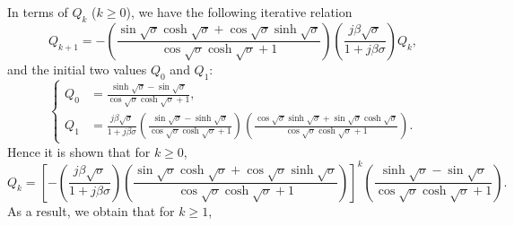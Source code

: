 \documentclass{svjour3}                     %
\begin{document}
In terms of $Q_k$ ($k \geq 0$), we have the following iterative relation
\begin{equation}
    Q_{k+1} = - \left( \frac{ \sin\sqrt{\sigma} \cosh\sqrt{\sigma} + \cos\sqrt{\sigma} \sinh\sqrt{\sigma} }{ \cos\sqrt{\sigma }\cosh\sqrt{\sigma }+1 } \right) \left( \frac{j \beta \sqrt{\sigma }}{1+j \beta \sigma } \right) Q_k,
\end{equation}
and the initial two values $Q_0$ and $Q_1$:
\begin{equation}
    \left\{\begin{aligned}
        Q_0 &= \frac{\sinh\sqrt{\sigma }-\sin\sqrt{\sigma }}{\cos\sqrt{\sigma } \cosh\sqrt{\sigma }+1}, \\
        Q_{1} &= \frac{j \beta  \sqrt{\sigma }}{1+j \beta  \sigma } \left(\frac{\sin\sqrt{\sigma } -\sinh\sqrt{\sigma }}{\cos\sqrt{\sigma } \cosh\sqrt{\sigma }+1} \right)  \left( \frac{\cos\sqrt{\sigma } \sinh\sqrt{\sigma }+\sin\sqrt{\sigma } \cosh\sqrt{\sigma }}{\cos\sqrt{\sigma } \cosh\sqrt{\sigma }+1} \right).
    \end{aligned}\right.
\end{equation}
Hence it is shown that for $k \geq 0$,
\begin{equation}
    Q_{k} = \left[- \left( \frac{j \beta \sqrt{\sigma }}{1+j \beta \sigma } \right) \left( \frac{ \sin\sqrt{\sigma} \cosh\sqrt{\sigma} + \cos\sqrt{\sigma} \sinh\sqrt{\sigma} }{ \cos\sqrt{\sigma }\cosh\sqrt{\sigma }+1 } \right)  \right]^k \left( \frac{\sinh\sqrt{\sigma }-\sin\sqrt{\sigma }}{\cos\sqrt{\sigma } \cosh\sqrt{\sigma }+1} \right).
\end{equation}
As a result, we obtain that for $k \geq 1$,
\footnotesize
\end{document}
